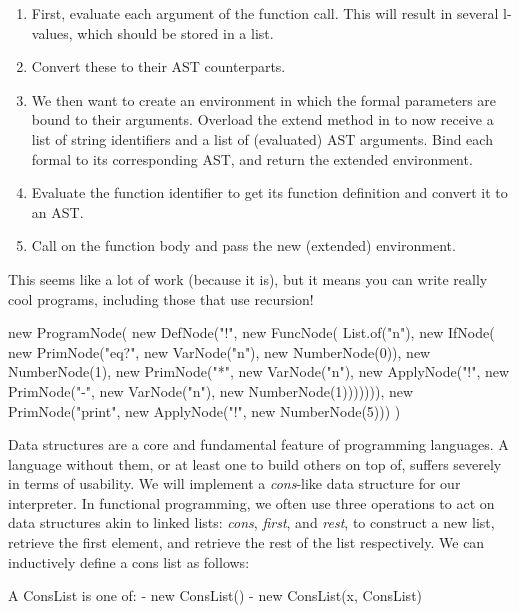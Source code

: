 \begin{enumerate}[label=(\alph*)]
  \begin{enumerate}[label=(\roman*)] 
  \item First, evaluate each argument of the function call. This will result in several l-values, which should be stored in a list. 
  \item Convert these to their AST counterparts. 
  \item We then want to create an environment in which the formal parameters are bound to their arguments. Overload the extend method in  to now receive a list of string identifiers and a list of (evaluated) AST arguments. Bind each formal to its corresponding AST, and return the extended environment. 
  \item Evaluate the function identifier to get its function definition and convert it to an AST.
  \item Call  on the function body and pass the new (extended) environment.
  \end{enumerate}
  This seems like a lot of work (because it is), but it means you can write really cool programs, including those that use recursion!
  \begin{verbnobox}[\small]
new ProgramNode(
  new DefNode("!", 
    new FuncNode(
      List.of("n"),
      new IfNode(
        new PrimNode("eq?", 
          new VarNode("n"), 
          new NumberNode(0)),
        new NumberNode(1),
        new PrimNode("*", 
          new VarNode("n"), 
          new ApplyNode("!", 
            new PrimNode("-", 
            new VarNode("n"), 
            new NumberNode(1))))))),
  new PrimNode("print", new ApplyNode("!", new NumberNode(5)))
)
\end{verbnobox}
\end{enumerate}

Data structures are a core and fundamental feature of programming languages. A language without them, or at least one to build others on top of, suffers severely in terms of usability. We will implement a \emph{cons}-like data structure for our interpreter. In functional programming, we often use three operations to act on data structures akin to linked lists: \emph{cons}, \emph{first}, and \emph{rest}, to construct a new list, retrieve the first element, and retrieve the rest of the list respectively. We can inductively define a cons list as follows:

\begin{verbnobox}[\small]
A ConsList is one of:
 - new ConsList()
 - new ConsList(x, ConsList)
\end{verbnobox}


